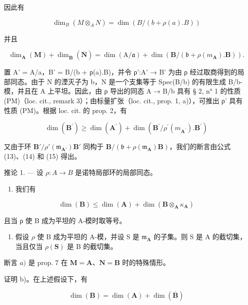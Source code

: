 因此有

\[
\dim_ {B} (M \otimes_ {A} N) = \dim (B / (b + \rho (a). B))\tag{13}
\]

并且

\[
\dim_ {\mathbf {A}} (\mathbf {M}) + \dim_ {\overline {{\mathbf {B}}}} (\overline {{\mathbf {N}}}) = \dim (\mathrm{A} / \mathfrak {a}) + \dim (\mathbf {B} / (\mathfrak {b} + \rho (m _ {\mathbf {A}}). \mathbf {B}))  .\tag{14}
\]

置 A' = A/a，B' = B/(b + ρ(a).B)，并令 ρ':A' → B' 为由 ρ 经过取商得到的局部同态。由于 N 的湮灭子为 b，N 是一个支集等于 Spec(B/b) 的有限生成 B/b-模，并且在 A 上平坦。因此，由 ρ 导出的同态 A → B/b 具有 § 2, n° 1 的性质 (PM)（loc. cit., remark 3）；由标量扩张（loc. cit., prop. 1, a)），可推出 ρ' 具有性质 (PM)。根据 loc. cit. 的 prop. 2，有

\[
\dim (\mathbf {B} ^ {\prime}) \geqslant \dim (\mathbf {A} ^ {\prime}) + \dim (\mathbf {B} ^ {\prime} / \rho^ {\prime} (m _ {\mathbf {A} ^ {\prime}}). \mathbf {B} ^ {\prime})\tag{15}
\]

又由于环 \(\mathbf{B}'/\rho'(\mathfrak{m}_{\mathbf{A}'})\mathbf{B}'\) 同构于 \(\mathbf{B}/(\mathfrak{b} + \rho(\mathfrak{m}_{\mathbf{A}})\mathbf{B})\)，我们的断言由公式 (13)、(14) 和 (15) 得出。

推论 1. --- 设 \(\rho: A \to B\) 是诺特局部环的局部同态。

\begin{enumerate}
\def\labelenumi{\alph{enumi})}
\tightlist
\item
  我们有
\end{enumerate}

\[
\dim (\mathbf {B}) \leqslant \dim (\mathbf {A}) + \dim (\mathbf {B} \otimes_ {\mathbf {A}} \kappa_ {\mathbf {A}})\tag{16}
\]

且当 ρ 使 B 成为平坦的 A-模时取等号。

\begin{enumerate}
\def\labelenumi{\alph{enumi})}
\setcounter{enumi}{1}
\tightlist
\item
  假设 \(\rho\) 使 B 成为平坦的 A-模，并设 S 是 \(\mathfrak{m}_{\mathbf{A}}\) 的子集。则 S 是 A 的截切集，当且仅当 \(\rho(\mathbf{S})\) 是 B 的截切集。
\end{enumerate}

断言 \(a)\) 是 prop. 7 在 \(\mathbf{M} = \mathbf{A}\)、\(\mathbf{N} = \mathbf{B}\) 时的特殊情形。

证明 b)。在上述假设下，有

\[
\dim (\mathbf {B}) = \dim (\mathbf {A}) + \dim (\overline {{\mathbf {B}}})\tag{17}
\]

